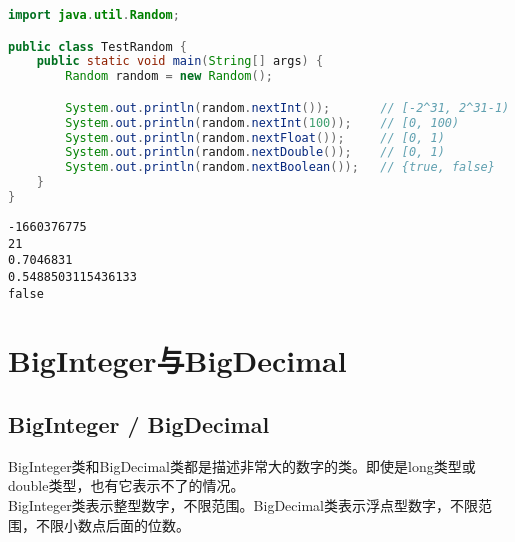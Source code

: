 \begin{lstlisting}[language=Java]
import java.util.Random;

public class TestRandom {
    public static void main(String[] args) {
        Random random = new Random();

        System.out.println(random.nextInt());       // [-2^31, 2^31-1)
        System.out.println(random.nextInt(100));    // [0, 100)
        System.out.println(random.nextFloat());     // [0, 1)
        System.out.println(random.nextDouble());    // [0, 1)
        System.out.println(random.nextBoolean());   // {true, false}
    }
}
\end{lstlisting}

\begin{tcolorbox}
	\begin{verbatim}
-1660376775
21
0.7046831
0.5488503115436133
false
	\end{verbatim}
\end{tcolorbox}

\newpage

\section{BigInteger与BigDecimal}

\subsection{BigInteger / BigDecimal}

BigInteger类和BigDecimal类都是描述非常大的数字的类。即使是long类型或double类型，也有它表示不了的情况。 \\

BigInteger类表示整型数字，不限范围。BigDecimal类表示浮点型数字，不限范围，不限小数点后面的位数。

